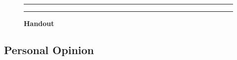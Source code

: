 \documentclass[]{article}
\begin{document}
\begin{figure}[!ht]
    \hrule
    \caption{ \textbf{Handout} }
    \begin{center}
    \end{center}
    \label{fig:handout-1}
    \hrule
\end{figure}

\newpage

\subsection{Personal Opinion}
\label{sec:appendix-personl-opinion}
\end{document}
